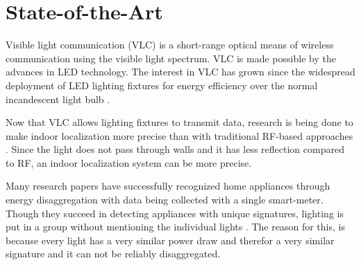
\chapter{State-of-the-Art}
\label{chp:state-of-the-art}



Visible light communication (VLC) is a short-range optical means of wireless communication using the visible light spectrum.
VLC is made possible by the advances in LED technology.
The interest in VLC has grown since the widespread deployment of LED lighting fixtures for energy efficiency over the normal incandescent light bulb \cite{rajagopal2012ieee}.


Now that VLC allows lighting fixtures to transmit data, research is being done to make indoor localization more precise than with traditional RF-based approaches \cite{Kuo:2014:LIP:2639108.2639109}.
Since the light does not pass through walls and it has less reflection compared to RF, an indoor localization system can be more precise.



Many research papers have successfully recognized home appliances through energy disaggregation with data being collected with a single smart-meter.   
Though they succeed in detecting appliances with unique signatures, lighting is put in a group without mentioning the individual lights \cite{kolter2011redd}.
The reason for this, is because every light has a very similar power draw and therefor a very similar signature and it can not be reliably disaggregated.


